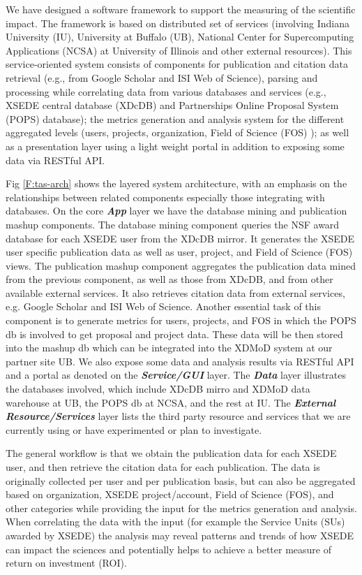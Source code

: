 \documentclass{sig-alternate}
\begin{document}
We have designed a software framework to support the measuring of the scientific impact. The framework is based on distributed set of services (involving Indiana University (IU), University at Buffalo (UB), National Center for Supercomputing Applications (NCSA) at University of Illinois and other external resources). This service-oriented system  consists of components for publication and citation data retrieval (e.g., from Google Scholar and ISI Web of Science), parsing and processing while correlating data from various databases and services (e.g., XSEDE central database (XDcDB) and Partnerships Online Proposal System (POPS) database); the metrics generation and analysis system for the different aggregated levels (users, projects, organization, Field of Science (FOS) ); as well as a presentation layer using a light weight portal in addition to exposing some data via RESTful API. 
 
Fig \ref{F:tas-arch} shows the layered system architecture, with an emphasis on the relationships between related components especially those integrating with databases. On the core \emph{\textbf{App}} layer we have the database mining and publication mashup components. The database mining component queries the NSF award database for each XSEDE user from the XDcDB mirror. It generates the XSEDE user specific publication data as well as user, project, and Field of Science (FOS) views. The publication mashup component aggregates the publication data mined from the previous component, as well as those from XDcDB, and from other available external services. It also retrieves citation data from external services, e.g. Google Scholar and ISI Web of Science. Another essential task of this component is to generate metrics for users, projects, and FOS in which the POPS db is involved to get proposal and project data. These data will be then stored into the mashup db which can be integrated into the XDMoD \cite{CPE:CPE2871} system at our partner site UB. We also expose some data and analysis results via RESTful API and a portal as denoted on the \emph{\textbf{Service/GUI}} layer. The \emph{\textbf{Data}} layer illustrates the databases involved, which include XDcDB mirro and XDMoD data warehouse at UB, the POPS db at NCSA, and the rest at IU. The \emph{\textbf{External Resource/Services}} layer lists the third party resource and services that we are currently using or have experimented or plan to investigate.

The general workflow is that we obtain the publication data for each XSEDE user, and then retrieve the citation data for each publication. The data is originally collected per user and per publication basis, but can also be aggregated based on organization, XSEDE project/account, Field of Science (FOS), and other categories while providing the input for the metrics generation and analysis. When correlating the data with the input (for example the Service Units (SUs) awarded by XSEDE) the analysis may reveal patterns and trends of how XSEDE can impact the sciences and potentially helps to achieve a better measure of return on investment (ROI). 
 
\end{document}
